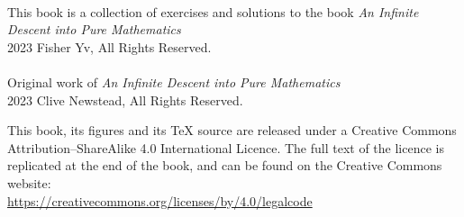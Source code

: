 {\small
~

\vfill

\thispagestyle{empty}
{%
This book is a collection of exercises and solutions to the book \textit{An Infinite Descent into Pure Mathematics}\\
\textcopyright{} 2023 Fisher Yv, All Rights Reserved.\\
\\
Original work of \textit{An Infinite Descent into Pure Mathematics}\\
\textcopyright{} 2023 Clive Newstead, All Rights Reserved.%
}{%

}


\begin{minipage}{0.75\textwidth}
\small
This book, its figures and its \TeX{} source are released under a Creative Commons Attribution--ShareAlike 4.0 International Licence. The full text of the licence is replicated at the end of the book, and can be found on the Creative Commons website:\\
\url{https://creativecommons.org/licenses/by/4.0/legalcode}
\end{minipage}

}